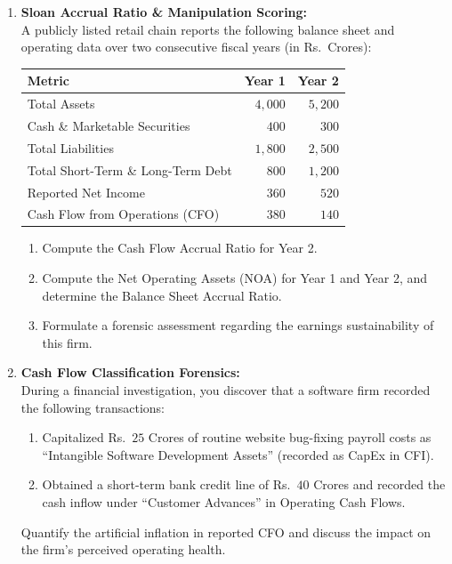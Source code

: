 \begin{enumerate}[label=\textbf{P3.\arabic*}]
    \item \textbf{Sloan Accrual Ratio \& Manipulation Scoring:}\\
    A publicly listed retail chain reports the following balance sheet and operating data over two consecutive fiscal years (in Rs.~Crores):
    \begin{center}
    \begin{tabular}{lrr}
    \toprule
    \textbf{Metric} & \textbf{Year 1} & \textbf{Year 2} \\
    \midrule
    Total Assets & $4{,}000$ & $5{,}200$ \\
    Cash \& Marketable Securities & $400$ & $300$ \\
    Total Liabilities & $1{,}800$ & $2{,}500$ \\
    Total Short-Term \& Long-Term Debt & $800$ & $1{,}200$ \\
    Reported Net Income & $360$ & $520$ \\
    Cash Flow from Operations (CFO) & $380$ & $140$ \\
    \bottomrule
    \end{tabular}
    \end{center}
    \begin{enumerate}[label=(\alph*)]
        \item Compute the Cash Flow Accrual Ratio for Year 2.
        \item Compute the Net Operating Assets (NOA) for Year 1 and Year 2, and determine the Balance Sheet Accrual Ratio.
        \item Formulate a forensic assessment regarding the earnings sustainability of this firm.
    \end{enumerate}

    \item \textbf{Cash Flow Classification Forensics:}\\
    During a financial investigation, you discover that a software firm recorded the following transactions:
    \begin{enumerate}[label=(\alph*)]
        \item Capitalized Rs.~$25$ Crores of routine website bug-fixing payroll costs as ``Intangible Software Development Assets'' (recorded as CapEx in CFI).
        \item Obtained a short-term bank credit line of Rs.~$40$ Crores and recorded the cash inflow under ``Customer Advances'' in Operating Cash Flows.
    \end{enumerate}
    Quantify the artificial inflation in reported CFO and discuss the impact on the firm's perceived operating health.


\end{enumerate}
